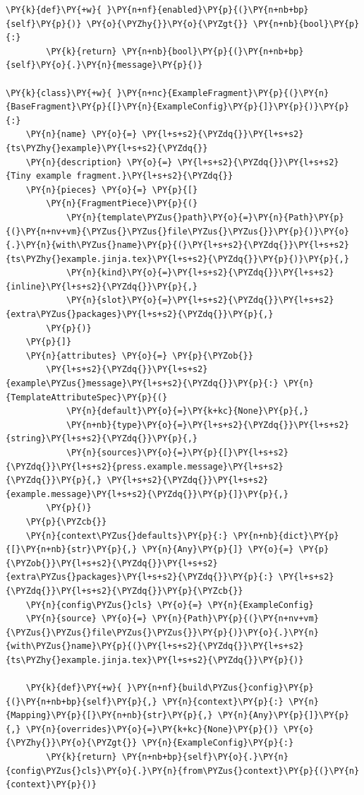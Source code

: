 \documentclass[a4paper,twoside]{article}
\begin{document}
\begin{tscode}[lang=python, engine=pygments]
\begin{Verbatim}[commandchars=\\\{\},breaklines, breakanywhere, commandchars=\\\{\}]
    \PY{k}{def}\PY{+w}{ }\PY{n+nf}{enabled}\PY{p}{(}\PY{n+nb+bp}{self}\PY{p}{)} \PY{o}{\PYZhy{}}\PY{o}{\PYZgt{}} \PY{n+nb}{bool}\PY{p}{:}
        \PY{k}{return} \PY{n+nb}{bool}\PY{p}{(}\PY{n+nb+bp}{self}\PY{o}{.}\PY{n}{message}\PY{p}{)}

\PY{k}{class}\PY{+w}{ }\PY{n+nc}{ExampleFragment}\PY{p}{(}\PY{n}{BaseFragment}\PY{p}{[}\PY{n}{ExampleConfig}\PY{p}{]}\PY{p}{)}\PY{p}{:}
    \PY{n}{name} \PY{o}{=} \PY{l+s+s2}{\PYZdq{}}\PY{l+s+s2}{ts\PYZhy{}example}\PY{l+s+s2}{\PYZdq{}}
    \PY{n}{description} \PY{o}{=} \PY{l+s+s2}{\PYZdq{}}\PY{l+s+s2}{Tiny example fragment.}\PY{l+s+s2}{\PYZdq{}}
    \PY{n}{pieces} \PY{o}{=} \PY{p}{[}
        \PY{n}{FragmentPiece}\PY{p}{(}
            \PY{n}{template\PYZus{}path}\PY{o}{=}\PY{n}{Path}\PY{p}{(}\PY{n+nv+vm}{\PYZus{}\PYZus{}file\PYZus{}\PYZus{}}\PY{p}{)}\PY{o}{.}\PY{n}{with\PYZus{}name}\PY{p}{(}\PY{l+s+s2}{\PYZdq{}}\PY{l+s+s2}{ts\PYZhy{}example.jinja.tex}\PY{l+s+s2}{\PYZdq{}}\PY{p}{)}\PY{p}{,}
            \PY{n}{kind}\PY{o}{=}\PY{l+s+s2}{\PYZdq{}}\PY{l+s+s2}{inline}\PY{l+s+s2}{\PYZdq{}}\PY{p}{,}
            \PY{n}{slot}\PY{o}{=}\PY{l+s+s2}{\PYZdq{}}\PY{l+s+s2}{extra\PYZus{}packages}\PY{l+s+s2}{\PYZdq{}}\PY{p}{,}
        \PY{p}{)}
    \PY{p}{]}
    \PY{n}{attributes} \PY{o}{=} \PY{p}{\PYZob{}}
        \PY{l+s+s2}{\PYZdq{}}\PY{l+s+s2}{example\PYZus{}message}\PY{l+s+s2}{\PYZdq{}}\PY{p}{:} \PY{n}{TemplateAttributeSpec}\PY{p}{(}
            \PY{n}{default}\PY{o}{=}\PY{k+kc}{None}\PY{p}{,}
            \PY{n+nb}{type}\PY{o}{=}\PY{l+s+s2}{\PYZdq{}}\PY{l+s+s2}{string}\PY{l+s+s2}{\PYZdq{}}\PY{p}{,}
            \PY{n}{sources}\PY{o}{=}\PY{p}{[}\PY{l+s+s2}{\PYZdq{}}\PY{l+s+s2}{press.example.message}\PY{l+s+s2}{\PYZdq{}}\PY{p}{,} \PY{l+s+s2}{\PYZdq{}}\PY{l+s+s2}{example.message}\PY{l+s+s2}{\PYZdq{}}\PY{p}{]}\PY{p}{,}
        \PY{p}{)}
    \PY{p}{\PYZcb{}}
    \PY{n}{context\PYZus{}defaults}\PY{p}{:} \PY{n+nb}{dict}\PY{p}{[}\PY{n+nb}{str}\PY{p}{,} \PY{n}{Any}\PY{p}{]} \PY{o}{=} \PY{p}{\PYZob{}}\PY{l+s+s2}{\PYZdq{}}\PY{l+s+s2}{extra\PYZus{}packages}\PY{l+s+s2}{\PYZdq{}}\PY{p}{:} \PY{l+s+s2}{\PYZdq{}}\PY{l+s+s2}{\PYZdq{}}\PY{p}{\PYZcb{}}
    \PY{n}{config\PYZus{}cls} \PY{o}{=} \PY{n}{ExampleConfig}
    \PY{n}{source} \PY{o}{=} \PY{n}{Path}\PY{p}{(}\PY{n+nv+vm}{\PYZus{}\PYZus{}file\PYZus{}\PYZus{}}\PY{p}{)}\PY{o}{.}\PY{n}{with\PYZus{}name}\PY{p}{(}\PY{l+s+s2}{\PYZdq{}}\PY{l+s+s2}{ts\PYZhy{}example.jinja.tex}\PY{l+s+s2}{\PYZdq{}}\PY{p}{)}

    \PY{k}{def}\PY{+w}{ }\PY{n+nf}{build\PYZus{}config}\PY{p}{(}\PY{n+nb+bp}{self}\PY{p}{,} \PY{n}{context}\PY{p}{:} \PY{n}{Mapping}\PY{p}{[}\PY{n+nb}{str}\PY{p}{,} \PY{n}{Any}\PY{p}{]}\PY{p}{,} \PY{n}{overrides}\PY{o}{=}\PY{k+kc}{None}\PY{p}{)} \PY{o}{\PYZhy{}}\PY{o}{\PYZgt{}} \PY{n}{ExampleConfig}\PY{p}{:}
        \PY{k}{return} \PY{n+nb+bp}{self}\PY{o}{.}\PY{n}{config\PYZus{}cls}\PY{o}{.}\PY{n}{from\PYZus{}context}\PY{p}{(}\PY{n}{context}\PY{p}{)}


\end{Verbatim}
\end{tscode}
\end{document}
